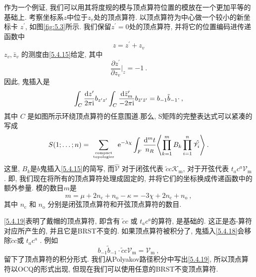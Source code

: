 作为一个例证, 我们可以用其将度规的模与顶点算符位置的模放在一个更加平等的基础上. 考察坐标系$z$中位于$z_{v}$处的顶点算符. 
以顶点算符为中心做一个较小的新坐标卡 $z^{\prime}$, 如图\ref{fig:5.3}所示. 我们保留$z^{\prime}=0$处的顶点算符, 并将它的位置编码进传递函数中
\begin{equation}
	z=z^{\prime}+z_{v} \label{5.4.16}
\end{equation}
 $z_{v}, \bar{z}_{v}$ 的测度由\eqref{5.4.15}给定, 其中
\begin{equation}
	\frac{\partial z^{\prime}}{\partial z_{v}}\biggr|_{z}=-1 \:. \label{5.4.17}
\end{equation}
因此, 鬼插入是
\begin{equation}
	\int_{C} \frac{\mathrm{d} z^{\prime}}{2 \pi \mathrm{i}} b_{z^{\prime} z^{\prime}} \int_{C} \frac{\mathrm{d} \bar{z}_{m}^{\prime}}{-2 \pi \mathrm{i}} b_{\bar{z}^{\prime} \bar{z}^{\prime}}=b_{-1} \tilde{b}_{-1} \cdot \:,  \label{5.4.18}
\end{equation}
其中 $C$ 是如图所示环绕顶点算符的任意围道.那么, S矩阵的完整表达式可以紧凑的写成
\begin{equation}
	S(1 ; \ldots ; n)=\sum_{
			\text { compact } \atop \text { topologies }
	} \mathrm{e}^{-\lambda \chi} \int_{F} \frac{\mathrm{d}^{m} t}{n_{R}}\Biggl\langle\prod_{k=1}^{m} B_{k} \prod_{i=1}^{n} \hat{\mathscr{V}}_{i}\Biggr\rangle \:.\label{5.4.19}
\end{equation}
这里,  $B_{k}$是$b$鬼插入\eqref{5.4.15}的简写, 而$\hat{\mathscr{V}}$ 对于闭弦代表 $\tilde{c} c \mathscr{K}_{\mathrm{m}}$, 
对于开弦代表 $t_{a} c^{a} \mathscr{V}_{\mathrm{m}}$. 即, 我们现在将所有的顶点算符处理成固定的, 并将它们的坐标换成传递函数中的额外参量. 模的数目$m$是
\begin{equation}
	m=\mu+2 n_{\mathrm{c}}+n_{\mathrm{o}}-\kappa=-3 \chi+2 n_{\mathrm{c}}+n_{\mathrm{o}} \:, \label{5.4.20}
\end{equation}
其中 $n_{\mathrm{c}}$ 和 $n_{\mathrm{o}}$ 分别是闭弦顶点算符和开弦顶点算符的数目.

\eqref{5.4.19}表明了戴帽的顶点算符, 即含有 $\tilde{c} c$ 或 $t_{a} c^{a}$的算符, 是基础的. 这正是态-算符对应所产生的, 并且它是BRST不变的. 如果顶点算符被积分了, 鬼插入\eqref{5.4.18}会移除$\tilde{c} c$或 $t_{a} c^{a} $ . 例如
\begin{equation}
	b_{-1} \tilde{b}_{-1} \cdot \tilde{c} c \mathscr{V}_{\mathrm{m}}=\mathscr{V}_{\mathrm{m}} \:, \label{5.4.21}
\end{equation}
留下了顶点算符的积分形式. 我们从Polyakov路径积分中写出\eqref{5.4.19}, 所以顶点算符以OCQ的形式出现, 但现在我们可以使用任意的BRST不变顶点算符.

